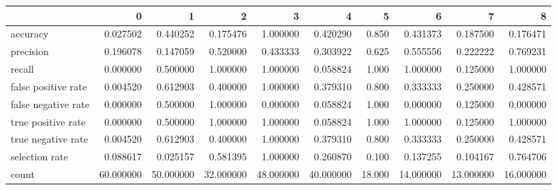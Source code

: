 \begin{tabular}{lrrrrrrrrr}
\toprule
{} &          0 &          1 &          2 &          3 &          4 &       5 &          6 &          7 &          8 \\
\midrule
accuracy            &   0.027502 &   0.440252 &   0.175476 &   1.000000 &   0.420290 &   0.850 &   0.431373 &   0.187500 &   0.176471 \\
precision           &   0.196078 &   0.147059 &   0.520000 &   0.433333 &   0.303922 &   0.625 &   0.555556 &   0.222222 &   0.769231 \\
recall              &   0.000000 &   0.500000 &   1.000000 &   1.000000 &   0.058824 &   1.000 &   1.000000 &   0.125000 &   1.000000 \\
false positive rate &   0.004520 &   0.612903 &   0.400000 &   1.000000 &   0.379310 &   0.800 &   0.333333 &   0.250000 &   0.428571 \\
false negative rate &   0.000000 &   0.500000 &   1.000000 &   0.000000 &   0.058824 &   1.000 &   0.000000 &   0.125000 &   0.000000 \\
true positive rate  &   0.000000 &   0.500000 &   1.000000 &   1.000000 &   0.058824 &   1.000 &   1.000000 &   0.125000 &   1.000000 \\
true negative rate  &   0.004520 &   0.612903 &   0.400000 &   1.000000 &   0.379310 &   0.800 &   0.333333 &   0.250000 &   0.428571 \\
selection rate      &   0.088617 &   0.025157 &   0.581395 &   1.000000 &   0.260870 &   0.100 &   0.137255 &   0.104167 &   0.764706 \\
count               &  60.000000 &  50.000000 &  32.000000 &  48.000000 &  40.000000 &  18.000 &  14.000000 &  13.000000 &  16.000000 \\
\bottomrule
\end{tabular}
